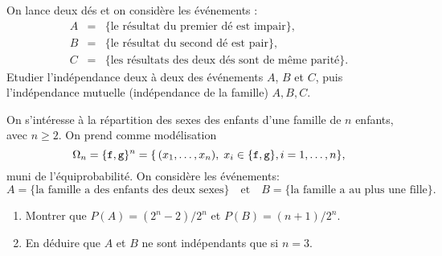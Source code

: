 \documentclass[a4paper,11pt,reqno]{amsart}
\begin{document}
\begin{exo}

  On lance deux dés et on considère les événements :
  \begin{eqnarray*}
    A & = & \{\text{le résultat du premier dé est impair}\},\\
    B & = & \{\text{le résultat du second dé est pair}\},\\
    C & = & \{\text{les résultats des deux dés sont de même parité}\}.
  \end{eqnarray*}
  Etudier l'indépendance deux à deux des événements $A$, $B$ et $C$,
  puis l'indépendance mutuelle (indépendance de la famille) $A,B,C$.

\end{exo}

\begin{exo}

  On s'intéresse à la répartition des sexes des enfants d'une famille de
  $n$ enfants, avec $n\geq 2$. On prend comme modélisation
    $$
      \Omega_n=\{{\tt f},{\tt g}\}^n=\{\,(x_1,\ldots,x_n),\; x_i\in\{{\tt f},{\tt g}\}, i=1,\dots,n\},
    $$
  muni de l'équiprobabilité. On considère les événements:
    $$
      A=\{\text{la famille a des enfants des deux sexes}\}
        \quad\text{et}\quad
      B=\{\text{la famille a au plus une fille}\}.
    $$

  \begin{enumerate}
    \item  Montrer que $P(A)=(2^n-2)/2^n$ et $P(B)=(n+1)/2^n$.
    \item  En déduire que $A$ et $B$ ne sont indépendants que si $n=3$.
  \end{enumerate}

 \end{exo}
\end{document}

